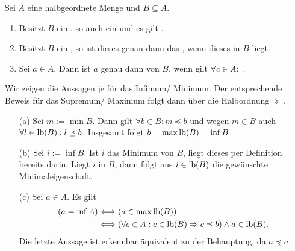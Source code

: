 \documentclass[../../main.tex]{subfiles}
\begin{document}
\begin{pro}\label{12.1.7}
Sei $A$ eine halbgeordnete Menge und $B\subseteq A$.
\begin{enumerate}[\normalfont(a)]
\item Besitzt $B$ ein , so auch ein  und es gilt .
\item Besitzt $B$ ein , so ist dieses genau dann das , wenn dieses in $B$ liegt.
\item Sei $a\in A$. Dann ist $a$ genau dann  von $B$, wenn gilt $\forall c\in A:$ .
\end{enumerate}
\end{pro}
\begin{cproof} Wir zeigen die Aussagen je für das Infimum/ Minimum. Der entsprechende Beweis für das Supremum/ Maximum folgt dann über die Halbordnung $\succeq$.
\begin{itemize}
\item[(a)] Sei $m:=\min B$. Dann gilt $\forall b\in B: m\preceq b$ und wegen $m\in B$ auch $\forall l\in \operatorname{lb}(B): l\preceq b$. Insgesamt folgt $b=\max\operatorname{lb}(B)=\inf B$.
\item[(b)] Sei $i:= \inf B$. Ist $i$ das Minimum von $B$, liegt dieses per Definition bereits darin. Liegt $i$ in $B$, dann folgt aus $i\in\operatorname{lb}(B)$ die gewünschte Minimaleigenschaft.
\item[(c)] Sei $a\in A$. Es gilt
\begin{align*}
(a=\inf A)&\Longleftrightarrow (a\in\max \operatorname{lb}(B))\\
&\Longleftrightarrow (\forall c\in A: c\in\operatorname{lb}(B)\Rightarrow c\preceq b)\land a\in \operatorname{lb}(B).
\end{align*}
Die letzte Aussage ist erkennbar äquivalent zu der Behauptung, da $a\preceq a$.
\end{itemize}
\end{cproof}
\end{document}
